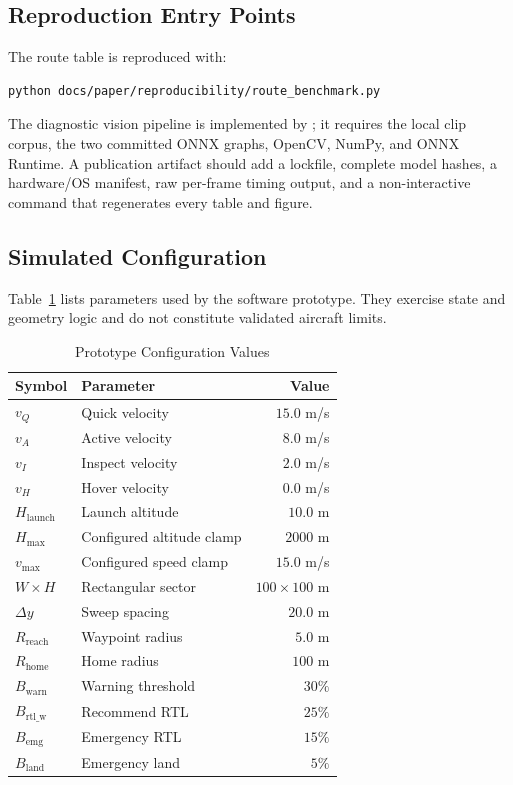 \subsection{Reproduction Entry Points}

The route table is reproduced with:
\begin{lstlisting}[language=bash]
python docs/paper/reproducibility/route_benchmark.py
\end{lstlisting}
The diagnostic vision pipeline is implemented by ; it requires the local clip corpus, the two committed ONNX graphs, OpenCV, NumPy, and ONNX Runtime. A publication artifact should add a lockfile, complete model hashes, a hardware/OS manifest, raw per-frame timing output, and a non-interactive command that regenerates every table and figure.

\subsection{Simulated Configuration}

Table~\ref{tab:prototype_config} lists parameters used by the software prototype. They exercise state and geometry logic and do not constitute validated aircraft limits.

\begin{table}[t]
\caption{Prototype Configuration Values}
\label{tab:prototype_config}
\centering
\footnotesize
\begin{tabular}{@{}llr@{}}
\toprule
\textbf{Symbol} & \textbf{Parameter} & \textbf{Value} \\
\midrule
$v_Q$ & Quick velocity & $15.0$ m/s \\
$v_A$ & Active velocity & $8.0$ m/s \\
$v_I$ & Inspect velocity & $2.0$ m/s \\
$v_H$ & Hover velocity & $0.0$ m/s \\
$H_{\mathrm{launch}}$ & Launch altitude & $10.0$ m \\
$H_{\max}$ & Configured altitude clamp & $2000$ m \\
$v_{\max}$ & Configured speed clamp & $15.0$ m/s \\
$W \times H$ & Rectangular sector & $100\times100$ m \\
$\Delta y$ & Sweep spacing & $20.0$ m \\
$R_{\mathrm{reach}}$ & Waypoint radius & $5.0$ m \\
$R_{\mathrm{home}}$ & Home radius & $100$ m \\
\midrule
$B_{\mathrm{warn}}$ & Warning threshold & $30\%$ \\
$B_{\mathrm{rtl\_w}}$ & Recommend RTL & $25\%$ \\
$B_{\mathrm{emg}}$ & Emergency RTL & $15\%$ \\
$B_{\mathrm{land}}$ & Emergency land & $5\%$ \\
\bottomrule
\end{tabular}
\end{table}
